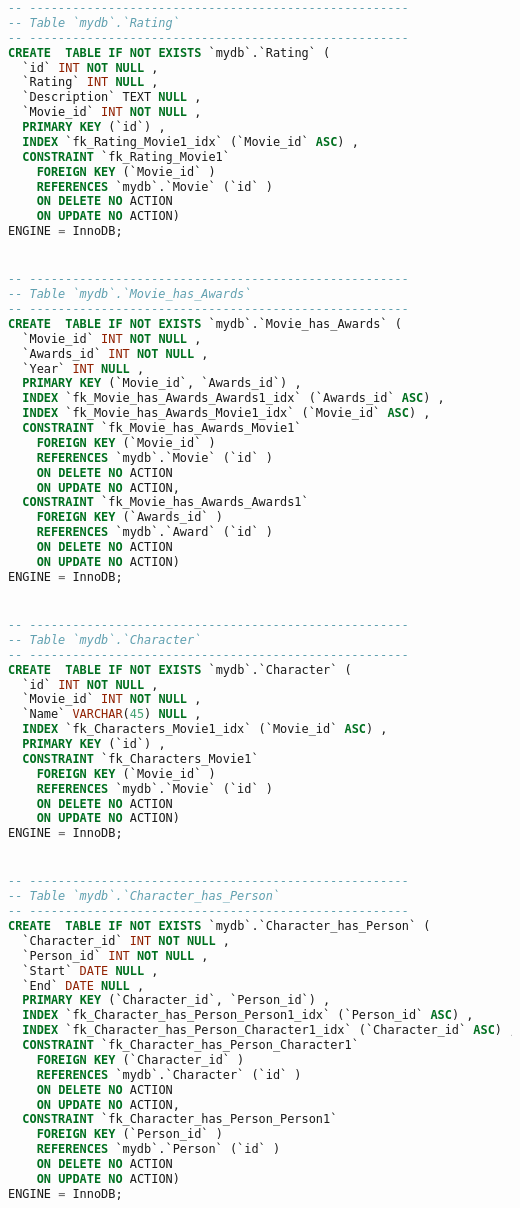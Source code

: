 \begin{lstlisting}[language=sql]
-- -----------------------------------------------------
-- Table `mydb`.`Rating`
-- -----------------------------------------------------
CREATE  TABLE IF NOT EXISTS `mydb`.`Rating` (
  `id` INT NOT NULL ,
  `Rating` INT NULL ,
  `Description` TEXT NULL ,
  `Movie_id` INT NOT NULL ,
  PRIMARY KEY (`id`) ,
  INDEX `fk_Rating_Movie1_idx` (`Movie_id` ASC) ,
  CONSTRAINT `fk_Rating_Movie1`
    FOREIGN KEY (`Movie_id` )
    REFERENCES `mydb`.`Movie` (`id` )
    ON DELETE NO ACTION
    ON UPDATE NO ACTION)
ENGINE = InnoDB;


-- -----------------------------------------------------
-- Table `mydb`.`Movie_has_Awards`
-- -----------------------------------------------------
CREATE  TABLE IF NOT EXISTS `mydb`.`Movie_has_Awards` (
  `Movie_id` INT NOT NULL ,
  `Awards_id` INT NOT NULL ,
  `Year` INT NULL ,
  PRIMARY KEY (`Movie_id`, `Awards_id`) ,
  INDEX `fk_Movie_has_Awards_Awards1_idx` (`Awards_id` ASC) ,
  INDEX `fk_Movie_has_Awards_Movie1_idx` (`Movie_id` ASC) ,
  CONSTRAINT `fk_Movie_has_Awards_Movie1`
    FOREIGN KEY (`Movie_id` )
    REFERENCES `mydb`.`Movie` (`id` )
    ON DELETE NO ACTION
    ON UPDATE NO ACTION,
  CONSTRAINT `fk_Movie_has_Awards_Awards1`
    FOREIGN KEY (`Awards_id` )
    REFERENCES `mydb`.`Award` (`id` )
    ON DELETE NO ACTION
    ON UPDATE NO ACTION)
ENGINE = InnoDB;


-- -----------------------------------------------------
-- Table `mydb`.`Character`
-- -----------------------------------------------------
CREATE  TABLE IF NOT EXISTS `mydb`.`Character` (
  `id` INT NOT NULL ,
  `Movie_id` INT NOT NULL ,
  `Name` VARCHAR(45) NULL ,
  INDEX `fk_Characters_Movie1_idx` (`Movie_id` ASC) ,
  PRIMARY KEY (`id`) ,
  CONSTRAINT `fk_Characters_Movie1`
    FOREIGN KEY (`Movie_id` )
    REFERENCES `mydb`.`Movie` (`id` )
    ON DELETE NO ACTION
    ON UPDATE NO ACTION)
ENGINE = InnoDB;


-- -----------------------------------------------------
-- Table `mydb`.`Character_has_Person`
-- -----------------------------------------------------
CREATE  TABLE IF NOT EXISTS `mydb`.`Character_has_Person` (
  `Character_id` INT NOT NULL ,
  `Person_id` INT NOT NULL ,
  `Start` DATE NULL ,
  `End` DATE NULL ,
  PRIMARY KEY (`Character_id`, `Person_id`) ,
  INDEX `fk_Character_has_Person_Person1_idx` (`Person_id` ASC) ,
  INDEX `fk_Character_has_Person_Character1_idx` (`Character_id` ASC) ,
  CONSTRAINT `fk_Character_has_Person_Character1`
    FOREIGN KEY (`Character_id` )
    REFERENCES `mydb`.`Character` (`id` )
    ON DELETE NO ACTION
    ON UPDATE NO ACTION,
  CONSTRAINT `fk_Character_has_Person_Person1`
    FOREIGN KEY (`Person_id` )
    REFERENCES `mydb`.`Person` (`id` )
    ON DELETE NO ACTION
    ON UPDATE NO ACTION)
ENGINE = InnoDB;



\end{lstlisting}
